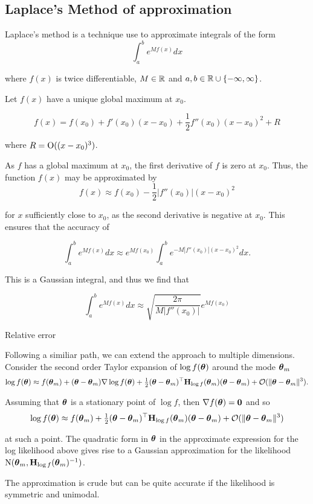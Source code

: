 \documentclass{amsart}[12pt]
\begin{document}
\subsection{Laplace's Method of approximation}

Laplace's method is a technique use to approximate integrals of the form
\[
	\int_a^b e^{M f(x)} dx
\]

where $f(x)$ is twice differentiable, $M \in {\mathbb{R}}$ and $a, b \in {\mathbb{R}} \cup \{-\infty, \infty\}$.

Let $f(x)$ have a unique global maximum at $x_0$.

\[
	f(x) = f(x_0) + f'(x_0) (x - x_0) + \frac{1}{2} f''(x_0) (x - x_0)^2 + R
\]

where $R = \text{O}((x - x_0)^3)$.

As $f$ has a global maximum at $x_0$, the first derivative of $f$ is zero at $x_0$. Thus, the function $f(x)$
may be approximated by
\[
	f(x) \approx f(x_0) - \frac{1}{2} |f''(x_0)| (x - x_0)^2
\]

for $x$ sufficiently close to $x_0$, as the second derivative is negative at $x_0$. This ensures that the
accuracy of

\[
	\int_a^b e^{M f(x)} dx \approx e^{M f(x_0)} \int_a^b e^{-M |f''(x_0)|(x - x_0)^2} dx.
\]

This is a Gaussian integral, and thus we find that

\[
	\int_a^b e^{M f(x)} dx \approx \sqrt{\frac{2 \pi}{M |f''(x_0)|}} e^{M f(x_0)}
\]

Relative error


Following a similiar path, we can extend the approach to multiple dimensions.
Consider the second order Taylor expansion of $\log f({\boldsymbol \theta})$ around the mode ${\boldsymbol \theta}_m$
$$
\log f({\boldsymbol \theta}) \approx f({\boldsymbol \theta}_m) + ({\boldsymbol \theta} - {\boldsymbol \theta}_m) \nabla \log f({\boldsymbol \theta}) + \tfrac{1}{2} ({\boldsymbol \theta} - {\boldsymbol \theta}_m)^\top {\bf H}_{\log f}({\boldsymbol \theta}_m) ({\boldsymbol \theta} - {\boldsymbol \theta}_m) + {\mathcal O}(\|{\boldsymbol \theta} - {\boldsymbol \theta}_m\|^3).
$$

Assuming that ${\boldsymbol \theta}$ is a stationary point of $\log f$, then $\nabla f({\boldsymbol \theta}) = {\bf 0}$ and so
$$
\log f({\boldsymbol \theta}) \approx f({\boldsymbol \theta}_m) + \tfrac{1}{2} ({\boldsymbol \theta} - {\boldsymbol \theta}_m)^\top {\bf H}_{\log f}({\boldsymbol \theta}_m) ({\boldsymbol \theta} - {\boldsymbol \theta}_m) + {\mathcal O}(\|{\boldsymbol \theta} - {\boldsymbol \theta}_m\|^3)
$$

at such a point. The quadratic form in ${\boldsymbol \theta}$ in the approximate expression for the log likelihood above gives 
rise to a Gaussian approximation for the likelihood $\text{N}({\boldsymbol \theta}_m, {\bf H}_{\log f}({\boldsymbol \theta}_m)^{-1})$.

The approximation is crude but can be quite accurate if the likelihood is symmetric and unimodal.
\end{document}
